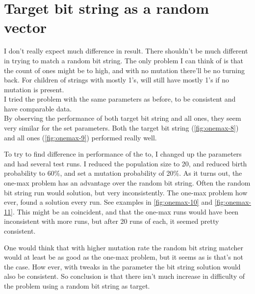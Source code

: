 \section{Target bit string as a random vector}
I don't really expect much difference in result. There shouldn't be much different in trying to
match a random bit string. The only problem I can think of is that the count of ones might be
to high, and with no mutation there'll be no turning back. For children of strings with 
mostly 1's, will still have mostly 1's if no mutation is present. \\

I tried the problem with the same parameters as before, to be consistent and have comparable
data. \\

By observing the performance of both target bit string and all ones, they seem very similar for
the set parameters. Both the target bit string (\autoref{fig:onemax-8}) and all ones (\autoref{fig:onemax-9})
performed really well.





To try to find difference in performance of the to, I changed up the parameters and had several test runs.
I reduced the population size to 20, and reduced birth probability to 60\%, and set a mutation probability
of 20\%. As it turns out, the one-max problem has an advantage over the random bit string. Often the 
random bit string run would solution, but very inconsistently. The one-max problem how ever, found a
solution every run. See examples in \autoref{fig:onemax-10} and \autoref{fig:onemax-11}. This might be
an coincident, and that the one-max runs would have been inconsistent with more runs, but after 20 runs
of each, it seemed pretty consistent. 





One would think that with higher mutation rate the random bit string matcher would at least be as good
as the one-max problem, but it seems as is that's not the case. How ever, with tweaks in the parameter
the bit string solution would also be consistent. So conclusion is that there isn't much increase in 
difficulty of the problem using a random bit string as target.
